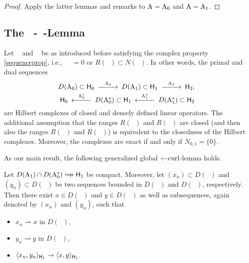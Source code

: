\documentclass[a4paper]{amsart}
\newcommand{\wto}{\rightharpoonup}
\renewcommand{\H}{\mathsf{H}}
\DeclareMathOperator{\Az}{A_{0}}
\DeclareMathOperator{\Azs}{A_{0}^{*}}
\DeclareMathOperator{\Ao}{A_{1}}
\DeclareMathOperator{\Aos}{A_{1}^{*}}
\newcommand{\cptemb}{\hookto\hspace*{-0.85em}\hookto}
\begin{document}
\begin{proof}
Apply the latter lemmas and remarks to $\A=\Az$ and $\A=\Ao$.
\end{proof}

\subsection{The $\Azs$-$\Ao$-Lemma}

Let $\Az$ and $\Ao$ be as introduced before satisfying
the complex property \eqref{sequenceprop}, i.e., $\Ao\Az=0$ or $R(\Az)\subset N(\Ao)$. 
In other words, the primal and dual sequences
\begin{align}
\begin{split}
\mylabel{complexdiag}
\begin{CD}
D(\Az)\subset\H_{0} @> \Az >>
D(\Ao)\subset\H_{1} @> \Ao >>
\H_{2},
\end{CD}\\
\begin{CD}
\H_{0} @< \Azs <<
D(\Azs)\subset\H_{1} @< \Aos <<
D(\Aos)\subset\H_{2}
\end{CD}
\end{split}
\end{align}
are Hilbert complexes of closed and densely defined linear operators.
The additional assumption that the ranges $R(\Az)$ and $R(\Ao)$ are closed
\big(and then also the ranges $R(\Azs)$ and $R(\Aos)$\big)
is equivalent to the closedness of the Hilbert complexes.
Moreover, the complexes are exact if and only if $N_{0,1}=\{0\}$.

As our main result, the following generalized global $\div$-$\operatorname{curl}$-lemma holds.

\begin{theo}[$\Azs$-$\Ao$-lemma]
Let $D(\Ao)\cap D(\Azs)\cptemb\H_{1}$ be compact.
Moreover, let $(x_{n})\subset D(\Ao)$ and $(y_{n})\subset D(\Azs)$ 
be two sequences bounded in $D(\Ao)$ and $D(\Azs)$, respectively.
Then there exist $x\in D(\Ao)$ and $y\in D(\Azs)$ as well as subsequences, again denoted by $(x_{n})$ and $(y_{n})$, 
such that
\begin{itemize}
\item
$x_{n}\wto x$ in $D(\Ao)$,
\item
$y_{n}\wto y$ in $D(\Azs)$,
\item
$\scp{x_{n}}{y_{n}}_{\H_{1}}\to\scp{x}{y}_{\H_{1}}$.
\end{itemize}
\end{theo}
\end{document}
